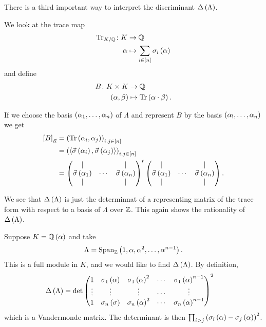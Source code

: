\documentclass[11pt]{article}
\begin{document}
\begin{remark}
There is a third important way to interpret the discriminant $\Delta\left( \Lambda \right)$.

We look at the trace map
\begin{align*}
\mathrm{Tr}_{K/\mathbb{Q}} \colon K &\to \mathbb{Q} \\
\alpha &\mapsto \sum_{i \in [n]} \sigma_i\left( \alpha \right)
\end{align*}
and define
\begin{align*}
B \colon K \times K &\to \mathbb{Q} \\
\left( \alpha, \beta \right) &\mapsto \mathrm{Tr}\left( \alpha \cdot \beta \right) \text{.}
\end{align*}

If we choose the basis $\left( \alpha_1, \ldots, \alpha_n \right)$ of $\Lambda$ and represent $B$ by the basis $\left( \alpha_!, \ldots, \alpha_n \right)$ we get
\begin{align*}
\brs{B}_{\vec{\alpha}} &= \prs{\mrm{Tr}\prs{\alpha_i, \alpha_j}}_{i,j \in [n]}
\\&=
\prs{\trs{\vec{\sigma}\prs{\alpha_i}, \vec{\sigma}\prs{\alpha_j}}}_{i,j \in [n]}
\\&= \pmat{\vert & & \vert \\ \vec{\sigma}\prs{\alpha_1} & \cdots & \vec{\sigma}\prs{\alpha_n} \\ \vert & & \vert}^t  \pmat{\vert & & \vert \\ \vec{\sigma}\prs{\alpha_1} & \cdots & \vec{\sigma}\prs{\alpha_n} \\ \vert & & \vert} \text{.}
\end{align*}

We see that $\Delta\left( \Lambda \right)$ is just the determinnat of a representing matrix of the trace form with respect to a basis of $\Lambda$ over $\mathbb{Z}$. This again shows the rationality of $\Delta\left( \Lambda \right)$.
\end{remark}

\begin{example}
Suppose $K = \mathbb{Q}\left( \alpha \right)$ and take
\[\Lambda = \operatorname{Span}_{\mathbb{Z}}\left( 1, \alpha, \alpha^2, \ldots, \alpha^{n-1} \right) \text{.}\]
This is a full module in $K$, and we would like to find $\Delta\left( \Lambda \right)$.
By definition,
\begin{align*}
\Delta\left( \Lambda \right) &= \det\begin{pmatrix}1 & \sigma_1\left( \alpha \right) & \sigma_1\left( \alpha \right)^2 & \cdots & \sigma_1\left( \alpha \right)^{n-1} \\ \vdots & \vdots & \vdots & \cdots & \vdots \\ 1 & \sigma_n\left( \sigma \right) & \sigma_n\left( \alpha \right)^2 & \cdots & \sigma_n\left( \alpha \right)^{n-1}\end{pmatrix}^2
\end{align*}
which is a Vandermonde matrix. The determinant is then $\prod_{i > j} \left( \sigma_i\left( \alpha \right) - \sigma_j\left( \alpha \right) \right)^2$.
\end{example}
\end{document}
